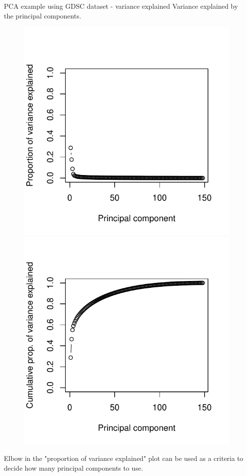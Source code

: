 \documentclass[notes]{beamer}          %
\begin{document}
\begin{frame}{PCA example using GDSC dataset - variance explained}
Variance explained by the principal components.
\begin{figure}
  \includegraphics[width=\linewidth]{../figures/week_6/GDSC_PCA_variance.pdf}  
\endminipage\hfill
{}
  \includegraphics[width=\linewidth]{../figures/week_6/GDSC_PCA_cumul_variance.pdf}  
\endminipage\hfill
\end{figure}

Elbow in the "proportion of variance explained" plot can be used as a criteria to decide how many principal components to use.
\end{frame}
\end{document}
